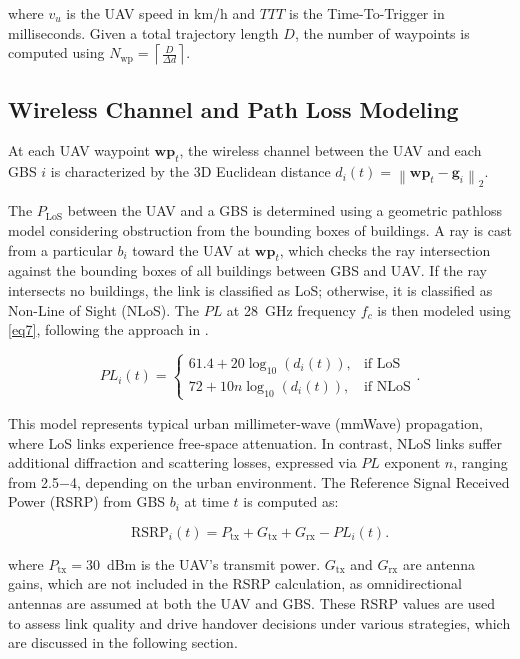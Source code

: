 \documentclass[10pt,conference]{IEEEtran}
\begin{document}
where $v_u$ is the UAV speed in km/h and $TTT$ is the Time-To-Trigger in milliseconds. Given a total trajectory length $D$, the number of waypoints is computed using $N_{\text{wp}} = \left\lceil \frac{D}{\Delta d} \right\rceil$.



\subsection{Wireless Channel and Path Loss Modeling}

At each UAV waypoint \(\mathbf{wp}_t\), the wireless channel between the UAV and each GBS $i$ is characterized by the 3D Euclidean distance $d_i(t) = \left\| \mathbf{wp}_t - \mathbf{g}_i \right\|_2$.


The $P_{\mathrm{LoS}}$ between the UAV and a GBS is determined using a geometric pathloss model considering obstruction from the bounding boxes of buildings. A ray is cast from a particular $b_i$ toward the UAV at $\mathbf{wp}_t$, which checks the ray intersection against the bounding boxes of all buildings between GBS and UAV. If the ray intersects no buildings, the link is classified as LoS; otherwise, it is classified as Non-Line of Sight (NLoS). The $PL$ at 28~GHz frequency $f_c$ is then modeled using \eqref{eq7}, following the approach in \cite{6834753}.

\begin{equation}
\label{eq7} 
PL_i(t) = 
\begin{cases}
61.4 + 20 \log_{10}(d_i(t)), & \text{if LoS} \\
72 +  10n\log_{10}(d_i(t)), & \text{if NLoS}
\end{cases}.
\end{equation}

This model represents typical urban millimeter-wave (mmWave) propagation, where LoS links experience free-space attenuation. In contrast, NLoS links suffer additional diffraction and scattering losses, expressed via $PL$ exponent $n$, ranging from 2.5$-$4, depending on the urban environment. The Reference Signal Received Power (RSRP) from GBS $b_i$ at time $t$ is computed as:

\begin{equation}
\text{RSRP}_i(t) = P_{\mathrm{tx}} + G_{\mathrm{tx}} + G_{\mathrm{rx}} - PL_i(t).
\end{equation}

where $P_{\mathrm{tx}} = 30$~dBm is the UAV's transmit power. $G_{\mathrm{tx}}$ and $G_{\mathrm{rx}}$ are antenna gains, which are not included in the RSRP calculation, as omnidirectional antennas are assumed at both the UAV and GBS. These RSRP values are used to assess link quality and drive handover decisions under various strategies, which are discussed in the following section. 
\end{document}
